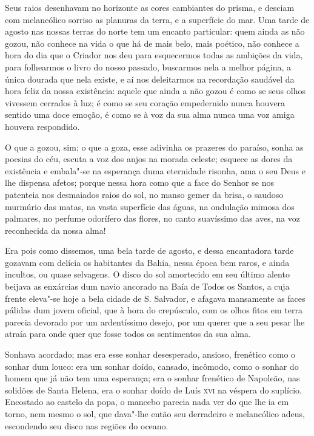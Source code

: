 Seus raios desenhavam no horizonte as cores cambiantes do prisma, e
desciam com melancólico sorriso as planuras da terra, e a superfície do
mar. Uma tarde de agosto nas nossas terras do norte tem um encanto
particular: quem ainda as não gozou, não conhece na vida o que há de
mais belo, mais poético, não conhece a hora do dia que o Criador nos deu
para esquecermos todas as ambições da vida, para folhearmos o livro do
nosso passado, buscarmos nela a melhor página, a única dourada que nela
existe, e aí nos deleitarmos na recordação saudável da hora feliz da
nossa existência: aquele que ainda a não gozou é como se seus olhos
vivessem cerrados à luz; é como se seu coração empedernido nunca houvera
sentido uma doce emoção, é como se à voz da sua alma nunca uma voz amiga
houvera respondido.

O que a gozou, sim; o que a goza, esse adivinha os prazeres do paraíso,
sonha as poesias do céu, escuta a voz dos anjos na morada celeste;
esquece as dores da existência e embala"-se na esperança duma eternidade
risonha, ama o seu Deus e lhe dispensa afetos; porque nessa hora como
que a face do Senhor se nos patenteia nos desmaiados raios do sol, no
manso gemer da brisa, o saudoso murmúrio das matas, na vasta superfície
das águas, na ondulação mimosa dos palmares, no perfume odorífero das
flores, no canto suavíssimo das aves, na voz reconhecida da nossa alma!

Era pois como dissemos, uma bela tarde de agosto, e dessa encantadora
tarde gozavam com delícia os habitantes da Bahia, nessa época bem raros,
e ainda incultos, ou quase selvagens. O disco do sol amortecido em seu
último alento beijava as enxárcias dum navio ancorado na Baía de Todos
os Santos, a cuja frente eleva"-se hoje a bela cidade de S. Salvador, e
afagava mansamente as faces pálidas dum jovem oficial, que à hora do
crepúsculo, com os olhos fitos em terra parecia devorado por um
ardentíssimo desejo, por um querer que a seu pesar lhe atraía para onde
quer que fosse todos os sentimentos da sua alma.

Sonhava acordado; mas era esse sonhar desesperado, ansioso, frenético
como o sonhar dum louco: era um sonhar doído, cansado, incômodo, como o
sonhar do homem que já não tem uma esperança; era o sonhar frenético de
Napoleão, nas solidões de Santa Helena, era o sonhar doído de Luís \textsc{xvi}
na véspera do suplício. Encostado ao castelo da popa, o mancebo parecia
nada ver do que lhe ia em torno, nem mesmo o sol, que dava"-lhe então seu
derradeiro e melancólico adeus, escondendo seu disco nas regiões do
oceano.

